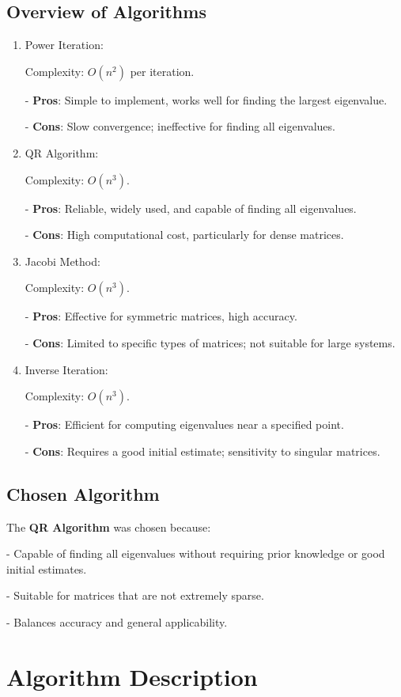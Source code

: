 \documentclass[journal]{IEEEtran}
\begin{document}
\subsection{Overview of Algorithms}
\begin{enumerate}
    \item Power Iteration:

Complexity: $O(n^2)$ per iteration.

- \textbf{Pros}: Simple to implement, works well for finding the largest eigenvalue. 


- \textbf{Cons}: Slow convergence; ineffective for finding all eigenvalues.

  \item QR Algorithm:

Complexity: $O(n^3)$.

- \textbf{Pros}: Reliable, widely used, and capable of finding all eigenvalues.

- \textbf{Cons}: High computational cost, particularly for dense matrices.

 \item Jacobi Method: 

Complexity: $O(n^3)$.

- \textbf{Pros}: Effective for symmetric matrices, high accuracy.

- \textbf{Cons}: Limited to specific types of matrices; not suitable for large systems.

 \item Inverse Iteration:

 Complexity: $O(n^3)$.

- \textbf{Pros}: Efficient for computing eigenvalues near a specified point.

- \textbf{Cons}: Requires a good initial estimate; sensitivity to singular matrices.

\end{enumerate}
\subsection{Chosen Algorithm}
The \textbf{QR Algorithm} was chosen because: 

- Capable of finding all eigenvalues without requiring prior knowledge or good initial estimates.

- Suitable for matrices that are not extremely sparse.

- Balances accuracy and general applicability.


\section{Algorithm Description}
\end{document}
